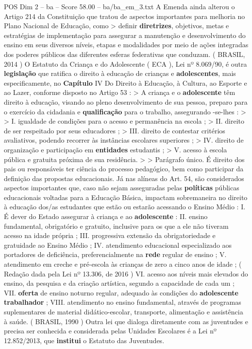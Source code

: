 \begin{textsample}{POS Dim 2 – ba – Score 58.00 – ba/ba\_em\_3.txt}
A Emenda ainda alterou o Artigo 214 da Constituição que tratou de aspectos importantes para melhoria no Plano Nacional de Educação, como > definir \textbf{diretrizes}, objetivos, metas e estratégias de implementação para assegurar a manutenção e desenvolvimento do ensino em seus diversos níveis, etapas e modalidades por meio de ações integradas dos poderes públicos das diferentes esferas federativas que conduzam. ( BRASIL, 2014 ) O Estatuto da Criança e do Adolescente ( ECA ), Lei nº 8.069/90, é outra \textbf{legislação} que ratifica o direito à educação de crianças e \textbf{adolescentes}, mais especificamente, no \textbf{Capítulo} IV Do Direito à Educação, à Cultura, ao Esporte e ao Lazer, conforme disposto no Artigo 53 : > A criança e o \textbf{adolescente} têm direito à educação, visando ao pleno desenvolvimento de sua pessoa, preparo para o exercício da cidadania e \textbf{qualificação} para o trabalho, assegurando -se-lhes : > > I. igualdade de condições para o acesso e permanência na escola ; > II. direito de ser respeitado por seus educadores ; > III. direito de contestar critérios avaliativos, podendo recorrer às instâncias escolares superiores ; > IV. direito de organização e participação em \textbf{entidades} estudantis ; > V. acesso à escola pública e gratuita próxima de sua residência. > > Parágrafo único.
É direito dos pais ou responsáveis ter ciência do processo pedagógico, bem como participar da definição das propostas educacionais.
Já nas alíneas do Art. 54, são considerados aspectos importantes que, caso não sejam asseguradas pelas \textbf{políticas} públicas educacionais voltadas para a Educação Básica, impactam sobremaneira no direito à educação dos/as estudantes que estão ou estarão acessando o Ensino Médio : I.
É dever do Estado assegurar à criança e ao \textbf{adolescente} : II. ensino fundamental, obrigatório e gratuito, inclusive para os que a ele não tiveram acesso na idade própria ; III. progressiva extensão da obrigatoriedade e gratuidade ao Ensino Médio ; IV. atendimento educacional especializado aos portadores de deficiência, preferencialmente na \textbf{rede} regular de ensino ; V. atendimento em creche e pré-escola às crianças de zero a cinco anos de idade ; ( Redação dada pela Lei nº 13.306, de 2016 ) VI. acesso aos níveis mais elevados do ensino, da pesquisa e da criação artística, segundo a capacidade de cada um ; VII. \textbf{oferta} de ensino noturno regular, adequado às condições do \textbf{adolescente} \textbf{trabalhador} ; VIII. atendimento no ensino fundamental, através de programas suplementares de material didático-escolar, transporte, alimentação e assistência à saúde. ( BRASIL, 1990 ) Outra lei que dialoga diretamente com as juventudes e precisa ser conhecida e considerada pelas Unidades Escolares é a Lei nº 12.852/2013, que \textbf{institui} o Estatuto das Juventudes.

\end{textsample}
